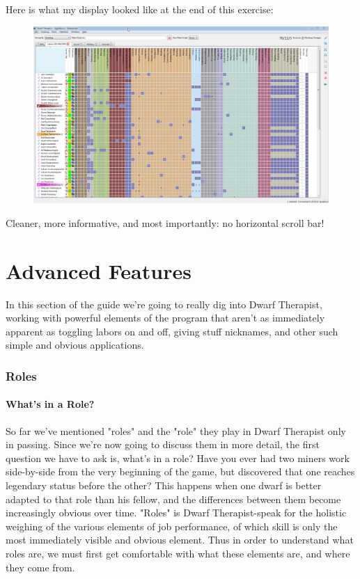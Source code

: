 \documentclass[]{article}
\begin{document}
Here is what my display looked like at the end of this exercise:
\begin{figure}[h!] \centering
\vspace{-5pt}
\includegraphics[scale=.37]{Sec2Fig28}
\vspace{-5pt}
\end{figure}

Cleaner, more informative, and most importantly: no horizontal scroll bar!

\newpage
\part{Advanced Features}
\label{sec:Advanced Features}

In this section of the guide we're going to really dig into Dwarf Therapist, working with powerful
elements of the program that aren't as immediately apparent as toggling labors on and off, giving stuff
nicknames, and other such simple and obvious applications.

\section{Roles}
\label{sec:Roles}
\subsection{What's in a Role?}
\label{What's in a Role?}
So far we've mentioned "roles" and the "role" they play in  Dwarf Therapist only in passing. Since we're
now going to discuss them in more detail, the first question we have to ask is, what's in a role?
Have you ever had two miners work side-by-side from the very beginning of the game, but
discovered that one reaches legendary status before the other? This happens when one dwarf is
better adapted to that role than his fellow, and the differences between them become increasingly
obvious over time. "Roles" is Dwarf Therapist-speak for the holistic weighing of the various
elements of job performance, of which skill is only the most immediately visible and obvious element.
Thus in order to understand what roles are, we must first get comfortable with what these elements are,
and where they come from.
\end{document}
